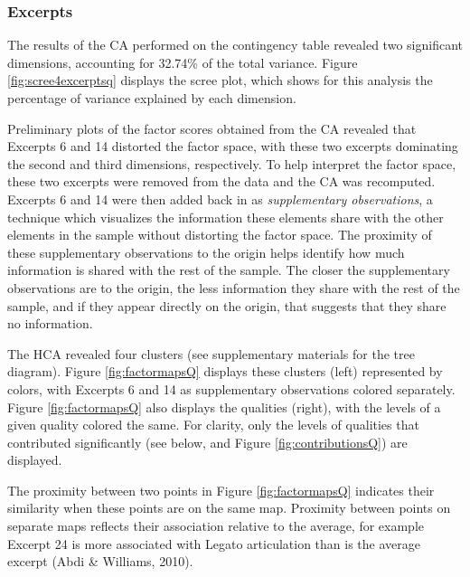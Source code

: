 \documentclass[
  english,
  man,floatsintext]{apa6}
\begin{document}
\hypertarget{excerpts}{%
\subsubsection{Excerpts}\label{excerpts}}

The results of the CA performed on the contingency table revealed two significant dimensions, accounting for 32.74\% of the total variance. Figure \ref{fig:scree4excerptsq} displays the scree plot, which shows for this analysis the percentage of variance explained by each dimension.

Preliminary plots of the factor scores obtained from the CA revealed that Excerpts 6 and 14 distorted the factor space, with these two excerpts dominating the second and third dimensions, respectively. To help interpret the factor space, these two excerpts were removed from the data and the CA was recomputed. Excerpts 6 and 14 were then added back in as \emph{supplementary observations}, a technique which visualizes the information these elements share with the other elements in the sample without distorting the factor space. The proximity of these supplementary observations to the origin helps identify how much information is shared with the rest of the sample. The closer the supplementary observations are to the origin, the less information they share with the rest of the sample, and if they appear directly on the origin, that suggests that they share no information.

The HCA revealed four clusters (see supplementary materials for the tree diagram). Figure \ref{fig:factormapsQ} displays these clusters (left) represented by colors, with Excerpts 6 and 14 as supplementary observations colored separately. Figure \ref{fig:factormapsQ} also displays the qualities (right), with the levels of a given quality colored the same. For clarity, only the levels of qualities that contributed significantly (see below, and Figure \ref{fig:contributionsQ}) are displayed.

The proximity between two points in Figure \ref{fig:factormapsQ} indicates their similarity when these points are on the same map. Proximity between points on separate maps reflects their association relative to the average, for example Excerpt 24 is more associated with Legato articulation than is the average excerpt (Abdi \& Williams, 2010).
\end{document}

